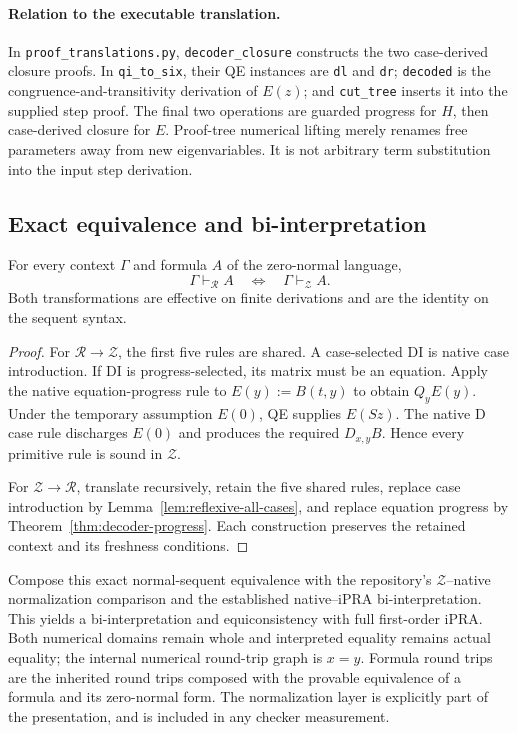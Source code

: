 \paragraph{Relation to the executable translation.}
In \texttt{proof\_translations.py}, \texttt{decoder\_closure} constructs
the two case-derived closure proofs.  In \texttt{qi\_to\_six}, their QE
instances are \texttt{dl} and \texttt{dr}; \texttt{decoded} is the
congruence-and-transitivity derivation of $E(z)$; and \texttt{cut\_tree}
inserts it into the supplied step proof.  The final two operations are
guarded progress for $H$, then case-derived closure for $E$.
Proof-tree numerical lifting merely renames free parameters away from
new eigenvariables.  It is not arbitrary term substitution into the
input step derivation.


\subsection{Exact equivalence and bi-interpretation}

\begin{theorem}
For every context $\Gamma$ and formula $A$ of the zero-normal language,
\[
 \Gamma\vdash_{\mathcal R}A
 \quad\Longleftrightarrow\quad
 \Gamma\vdash_{\mathcal Z}A.
\]
Both transformations are effective on finite derivations and are the
identity on the sequent syntax.
\end{theorem}
\begin{proof}
For $\mathcal R\to\mathcal Z$, the first five rules are shared.
A case-selected DI is native case introduction.  If DI is
progress-selected, its matrix must be an equation.  Apply the native
equation-progress rule to $E(y):=B(t,y)$ to obtain $Q_yE(y)$.
Under the temporary assumption $E(0)$, QE supplies $E(Sz)$.
The native D case rule discharges $E(0)$ and produces the required
$D_{x,y}B$.  Hence every primitive rule is sound in $\mathcal Z$.

For $\mathcal Z\to\mathcal R$, translate recursively, retain the
five shared rules, replace case introduction by
Lemma~\ref{lem:reflexive-all-cases}, and replace equation progress by
Theorem~\ref{thm:decoder-progress}.  Each construction preserves the
retained context and its freshness conditions.
\end{proof}

Compose this exact normal-sequent equivalence with the repository's
$\mathcal Z$--native normalization comparison and the established
native--iPRA bi-interpretation.  This yields a bi-interpretation and
equiconsistency with full first-order iPRA.  Both numerical domains
remain whole and interpreted equality remains actual equality; the
internal numerical round-trip graph is $x=y$.  Formula round trips are
the inherited round trips composed with the provable equivalence of a
formula and its zero-normal form.  The normalization layer is explicitly
part of the presentation, and is included in any checker measurement.


